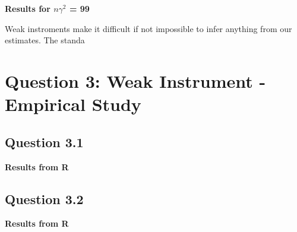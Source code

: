 \documentclass[11pt]{article}
\begin{document}
\begin{center}
	
	\centering
	
	\textbf{Results for $n \gamma^2$ = 99}\par\medskip
	\scalebox{1}{
		
	}
\end{center}

Weak instroments make it difficult if not impossible to infer anything from our estimates. The standa



\section{Question 3: Weak Instrument - Empirical Study}

\subsection{Question 3.1}

\begin{center}
	
	\centering
	
	\textbf{Results from R}\par\medskip
	\scalebox{1}{
		
	}
\end{center}


\subsection{Question 3.2}
\begin{center}
	
	\centering
	
	\textbf{Results from R}\par\medskip
	\scalebox{1}{
		
	}
\end{center}


\end{document}
